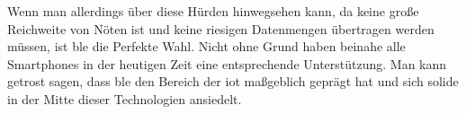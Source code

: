 \noindent Wenn man allerdings über diese Hürden hinwegsehen kann, da keine große Reichweite von Nöten ist und keine riesigen Datenmengen übertragen werden müssen, ist \ac{ble} die Perfekte Wahl. Nicht ohne Grund haben beinahe alle Smartphones in der heutigen Zeit eine entsprechende Unterstützung. Man kann getrost sagen, dass \ac{ble} den Bereich der \ac{iot} maßgeblich geprägt hat und sich solide in der Mitte dieser Technologien ansiedelt.\\     
